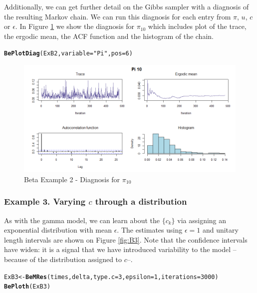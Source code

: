 \documentclass[letterpaper]{article}\usepackage[]{graphicx}\usepackage[]{color}
\makeatletter
\newcommand{\hlnum}[1]{\textcolor[rgb]{0.686,0.059,0.569}{#1}}%
\newcommand{\hlstr}[1]{\textcolor[rgb]{0.192,0.494,0.8}{#1}}%
\newcommand{\hlstd}[1]{\textcolor[rgb]{0.345,0.345,0.345}{#1}}%
\newcommand{\hlkwb}[1]{\textcolor[rgb]{0.69,0.353,0.396}{#1}}%
\newcommand{\hlkwc}[1]{\textcolor[rgb]{0.333,0.667,0.333}{#1}}%
\newcommand{\hlkwd}[1]{\textcolor[rgb]{0.737,0.353,0.396}{\textbf{#1}}}%
\newenvironment{kframe}{%
 \def\at@end@of@kframe{}%
 \ifinner\ifhmode%
  \def\at@end@of@kframe{\end{minipage}}%
  \begin{minipage}{\columnwidth}%
 \fi\fi%
 \def\FrameCommand##1{\hskip\@totalleftmargin \hskip-\fboxsep
 \colorbox{shadecolor}{##1}\hskip-\fboxsep
     \hskip-\linewidth \hskip-\@totalleftmargin \hskip\columnwidth}%
 \MakeFramed {\advance\hsize-\width
   \@totalleftmargin\z@ \linewidth\hsize
   \@setminipage}}%
 {\par\unskip\endMakeFramed%
 \at@end@of@kframe}
\newenvironment{knitrout}{}{} %
\makeatother
\begin{document}
Additionally, we can get further detail on the Gibbs sampler with a diagnosis of the resulting Markov chain. We can run this diagnosis for each entry from $\pi$, $u$, $c$ or $\epsilon$. In Figure \ref{fig:B2a} we show the diagnosis for $\pi_{10}$ which includes plot of the trace, the ergodic mean, the ACF function and the histogram of the chain.

\begin{knitrout}
\color{fgcolor}\begin{kframe}
\begin{alltt}
\hlkwd{BePlotDiag}\hlstd{(ExB2,} \hlkwc{variable} \hlstd{=} \hlstr{"Pi"}\hlstd{,} \hlkwc{pos} \hlstd{=} \hlnum{6}\hlstd{)}
\end{alltt}
\end{kframe}
\end{knitrout}

\begin{figure}
  \centering
  \includegraphics[width=\textwidth]{B23.png}
  \caption{Beta Example 2 - Diagnosis for $\pi_{10}$}
  \label{fig:B2a}
\end{figure}

\subsubsection{Example 3. Varying $c$ through a distribution}

As with the gamma model, we can learn about the $\{c_k\}$ via assigning an exponential distribution with mean $\epsilon$. The estimates using $\epsilon = 1$ and unitary length intervals are shown on Figure \ref{fig:B3}. Note that the confidence intervals have widen: it is a signal that we have introduced variability to the model --because of the distribution assigned to $c$--.
 
\begin{knitrout}
\color{fgcolor}\begin{kframe}
\begin{alltt}
\hlstd{ExB3} \hlkwb{<-} \hlkwd{BeMRes}\hlstd{(times, delta,} \hlkwc{type.c} \hlstd{=} \hlnum{3}\hlstd{,} \hlkwc{epsilon} \hlstd{=} \hlnum{1}\hlstd{,} \hlkwc{iterations} \hlstd{=} \hlnum{3000}\hlstd{)}
\hlkwd{BePloth}\hlstd{(ExB3)}
\end{alltt}
\end{kframe}
\end{knitrout}
\end{document}
